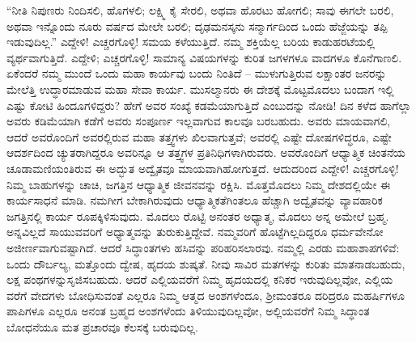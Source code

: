 “ನೀತಿ ನಿಪುಣರು ನಿಂದಿಸಲಿ, ಹೊಗಳಲಿ; ಲಕ್ಷ್ಮಿ ಕೈ ಸೇರಲಿ, ಅಥವಾ ಹೊರಟು ಹೋಗಲಿ; ಸಾವು ಈಗಲೇ ಬರಲಿ, ಅಥವಾ ಇನ್ನೊಂದು ನೂರು ವರ್ಷದ ಮೇಲೇ ಬರಲಿ; ದೃಢಮನಸ್ಕನು ಸನ್ಮಾರ್ಗದಿಂದ ಒಂದು ಹೆಜ್ಜೆಯನ್ನು ತಪ್ಪಿ ಇಡುವುದಿಲ್ಲ.” ಎದ್ದೇಳಿ! ಎಚ್ಚರಗೊಳ್ಳಿ! ಸಮಯ ಕಳೆಯುತ್ತಿದೆ. ನಮ್ಮ ಶಕ್ತಿಯೆಲ್ಲ ಬರಿಯ ಕಾಡುಹರಟೆಯಲ್ಲಿ ವ್ಯರ್ಥವಾಗುತ್ತಿದೆ. ಎದ್ದೇಳಿ; ಎಚ್ಚರಗೊಳ್ಳಿ! ಸಾಮಾನ್ಯ ವಿಷಯಗಳನ್ನು ಕುರಿತ ಜಗಳಗಳೂ ವಾದಗಳೂ ಕೊನೆಗಾಣಲಿ. ಏಕೆಂದರೆ ನಮ್ಮ ಮುಂದೆ ಒಂದು ಮಹಾ ಕಾರ್ಯವು ಬಂದು ನಿಂತಿದೆ – ಮುಳುಗುತ್ತಿರುವ ಲಕ್ಷಾಂತರ ಜನರನ್ನು ಮೇಲೆತ್ತಿ ಉದ್ಧಾರಮಾಡುವ ಮಹಾ ಸೇವಾ ಕಾರ್ಯ. ಮುಸಲ್ಮಾನರು ಈ ದೇಶಕ್ಕೆ ಮೊಟ್ಟಮೊದಲು ಬಂದಾಗ ಇಲ್ಲಿ ಎಷ್ಟು ಕೋಟಿ ಹಿಂದೂಗಳಿದ್ದರು? ಹೇಗೆ ಅವರ ಸಂಖ್ಯೆ ಕಡಮೆಯಾಗುತ್ತಿದೆ ಎಂಬುದನ್ನು ನೋಡಿ! ದಿನ ಕಳೆದ ಹಾಗೆಲ್ಲಾ ಅವರು ಕಡಿಮೆಯಾಗಿ ಕಡೆಗೆ ಅವರು ಸಂಪೂರ್ಣ ಇಲ್ಲವಾಗುವ ಕಾಲವೂ ಬರಬಹುದು. ಅವರು ಮಾಯವಾಗಲಿ, ಆದರೆ ಅವರೊಂದಿಗೆ ಅವರಲ್ಲಿರುವ ಮಹಾ ತತ್ತ್ವಗಳು ಖಿಲವಾಗುತ್ತವೆ; ಅವರಲ್ಲಿ ಎಷ್ಟೇ ದೋಷಗಳಿದ್ಧರೂ, ಎಷ್ಟೇ ಆದರ್ಶದಿಂದ ಚ್ಯುತರಾಗಿದ್ದರೂ ಅವರಿನ್ನೂ ಆ ತತ್ತ್ವಗಳ ಪ್ರತಿನಿಧಿಗಳಾಗಿರುವರು. ಅವರೊಂದಿಗೆ ಆಧ್ಯಾತ್ಮಿಕ ಚಿಂತನೆಯ ಚೂಡಾಮಣಿಯಂತಿರುವ ಈ ಅದ್ಭುತ ಅದ್ವೈತವೂ ಮಾಯವಾಗಿಹೋಗುತ್ತದೆ. ಆದುದರಿಂದ ಎದ್ದೇಳಿ! ಎಚ್ಚರಗೊಳ್ಳಿ! ನಿಮ್ಮ ಬಾಹುಗಳನ್ನು ಚಾಚಿ, ಜಗತ್ತಿನ ಆಧ್ಯಾತ್ಮಿಕ ಜೀವನವನ್ನು ರಕ್ಷಿಸಿ. ಮೊತ್ತಮೊದಲು ನಿಮ್ಮ ದೇಶದಲ್ಲಿಯೇ ಈ ಕಾರ್ಯಸಾಧನೆ ಮಾಡಿ. ನಮಗೀಗ ಬೇಕಾಗಿರುವುದು ಆಧ್ಯಾತ್ಮಿಕತೆಗಿಂತಲೂ ಹೆಚ್ಚಾಗಿ ಅದ್ವೈತವನ್ನು ವ್ಯಾವಹಾರಿಕ ಜಗತ್ತಿನಲ್ಲಿ ಕಾರ್ಯ ರೂಪಕ್ಕಿಳಿಸುವುದು. ಮೊದಲು ರೊಟ್ಟಿ ಅನಂತರ ಅಧ್ಯಾತ್ಮ, ಮೊದಲು ಅನ್ನ ಅಮೇಲೆ ಬ್ರಹ್ಮ. ಅನ್ನವಿಲ್ಲದೆ ಸಾಯುವವರಿಗೆ ಅಧ್ಯಾತ್ಮವನ್ನು ತುರುಕುತ್ತಿದ್ದೇವೆ. ನಮ್ಮವರಿಗೆ ಹೊಟ್ಟೆಗಿಲ್ಲದಿದ್ದರೂ ಧರ್ಮವೇನೋ ಅಜೀರ್ಣವಾಗುವಷ್ಟಾಗಿದೆ. ಆದರೆ ಸಿದ್ಧಾಂತಗಳು ಹಸಿವನ್ನು ಪರಿಹರಿಸಲಾರವು. ನಮ್ಮಲ್ಲಿ ಎರಡು ಮಹಾಶಾಪಗಳಿವೆ: ಒಂದು ದೌರ್ಬಲ್ಯ, ಮತ್ತೊಂದು ದ್ವೇಷ, ಹೃದಯ ಶುಷ್ಕತೆ. ನೀವು ಸಾವಿರ ಮತಗಳನ್ನು ಕುರಿತು ಮಾತನಾಡಬಹುದು, ಲಕ್ಷ ಪಂಥಗಳನ್ನು\break ಸೃಜಿಸಬಹುದು. ಆದರೆ ಎಲ್ಲಿಯವರೆಗೆ ನಿಮ್ಮ ಹೃದಯದಲ್ಲಿ ಕನಿಕರ ಇರುವು\-ದಿಲ್ಲವೋ, ಎಲ್ಲಿಯ ವರೆಗೆ ವೇದಗಳು ಬೋಧಿಸುವಂತೆ ಎಲ್ಲರೂ ನಿಮ್ಮ ಆತ್ಮದ ಅಂಶಗಳೆಂದೂ, ಶ‍್ರೀಮಂತರೂ ದರಿದ್ರರೂ ಮಹರ್ಷಿಗಳೂ ಪಾಪಿಗಳೂ ಎಲ್ಲರೂ ಅನಂತ ಬ್ರಹ್ಮದ ಅಂಶಗಳೆಂದು ತಿಳಿಯುವುದಿಲ್ಲವೋ, ಅಲ್ಲಿಯವರೆಗೆ ನಿಮ್ಮ ಸಿದ್ಧಾಂತ ಬೋಧನೆಯೂ ಮತ ಪ್ರಚಾರವೂ ಕೆಲಸಕ್ಕೆ ಬರುವುದಿಲ್ಲ.

